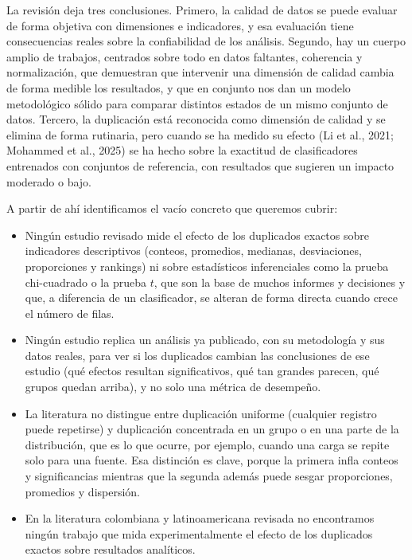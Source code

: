 \documentclass[11pt,openany,oneside,letterpaper]{book}
\begin{document}
La revisión deja tres conclusiones. Primero, la calidad de datos se puede evaluar de forma objetiva con dimensiones e indicadores, y esa evaluación tiene consecuencias reales sobre la confiabilidad de los análisis. Segundo, hay un cuerpo amplio de trabajos, centrados sobre todo en datos faltantes, coherencia y normalización, que demuestran que intervenir una dimensión de calidad cambia de forma medible los resultados, y que en conjunto nos dan un modelo metodológico sólido para comparar distintos estados de un mismo conjunto de datos. Tercero, la duplicación está reconocida como dimensión de calidad y se elimina de forma rutinaria, pero cuando se ha medido su efecto (Li et al., 2021; Mohammed et al., 2025) se ha hecho sobre la exactitud de clasificadores entrenados con conjuntos de referencia, con resultados que sugieren un impacto moderado o bajo.

A partir de ahí identificamos el vacío concreto que queremos cubrir:

\begin{itemize}
 \item Ningún estudio revisado mide el efecto de los duplicados exactos sobre indicadores descriptivos (conteos, promedios, medianas, desviaciones, proporciones y rankings) ni sobre estadísticos inferenciales como la prueba chi-cuadrado o la prueba $t$, que son la base de muchos informes y decisiones y que, a diferencia de un clasificador, se alteran de forma directa cuando crece el número de filas.
 \item Ningún estudio replica un análisis ya publicado, con su metodología y sus datos reales, para ver si los duplicados cambian las conclusiones de ese estudio (qué efectos resultan significativos, qué tan grandes parecen, qué grupos quedan arriba), y no solo una métrica de desempeño.
 \item La literatura no distingue entre duplicación uniforme (cualquier registro puede repetirse) y duplicación concentrada en un grupo o en una parte de la distribución, que es lo que ocurre, por ejemplo, cuando una carga se repite solo para una fuente. Esa distinción es clave, porque la primera infla conteos y significancias mientras que la segunda además puede sesgar proporciones, promedios y dispersión.
 \item En la literatura colombiana y latinoamericana revisada no encontramos ningún trabajo que mida experimentalmente el efecto de los duplicados exactos sobre resultados analíticos.
\end{itemize}
\end{document}
